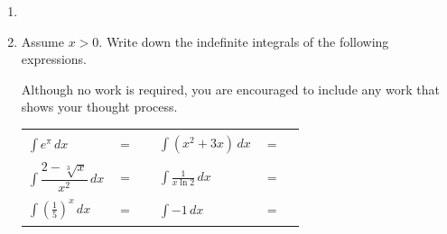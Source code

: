 \documentclass[11pt]{article}
\begin{document}
\begin{enumerate}
\newpage

\item


\newpage


\item Assume $x>0$. Write down the indefinite integrals of the following expressions. 

Although no work is required, you are encouraged to include any work that shows your thought process. 


\begin{center}
        \begin{tabular}{l c r l c r}
            $\displaystyle\int e^\pi \,dx$ & $=$ & \rule[-8pt]{1.5in}{0.4pt} &
            $\displaystyle\int \left(x^2+3x\right) \,dx$ & $=$ & \rule[-8pt]{1.5in}{0.4pt}\\[1in]
            $\displaystyle\int \dfrac{2-\sqrt[3]{x}}{x^2}\,dx$ & $=$ & \rule[-8pt]{1.5in}{0.4pt}&
            $\displaystyle\int \frac{1}{x \ln2}\,dx$ & $=$ & \rule[-8pt]{1.5in}{0.4pt}\\[1in]
            $\displaystyle\int \left(\frac{1}{5} \right)^x \,dx$ & $=$ & \rule[-8pt]{1.5in}{0.4pt} & 
            $\displaystyle\int -1 \,dx$ & $=$ & \rule[-8pt]{1.5in}{0.4pt}\\[0.3in]
        \end{tabular}
\end{center}


\newpage



\end{enumerate}
\end{document}
